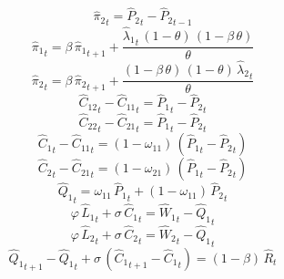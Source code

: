 \begin{dmath}
{{\hat{\pi}_{2}}}_{t}={{\hat{P}_{2}}}_{t}-{{\hat{P}_{2}}}_{t-1}
\end{dmath}
\begin{dmath}
{{\hat{\pi}_{1}}}_{t}={{\beta}}\, {{\hat{\pi}_{1}}}_{t+1}+\frac{{{\hat{\lambda}_{1}}}_{t}\, \left(1-{{\theta}}\right)\, \left(1-{{\beta}}\, {{\theta}}\right)}{{{\theta}}}
\end{dmath}
\begin{dmath}
{{\hat{\pi}_{2}}}_{t}={{\beta}}\, {{\hat{\pi}_{2}}}_{t+1}+\frac{\left(1-{{\beta}}\, {{\theta}}\right)\, \left(1-{{\theta}}\right)\, {{\hat{\lambda}_{2}}}_{t}}{{{\theta}}}
\end{dmath}
\begin{dmath}
{{\hat{C}_{1 2}}}_{t}-{{\hat{C}_{1 1}}}_{t}={{\hat{P}_{1}}}_{t}-{{\hat{P}_{2}}}_{t}
\end{dmath}
\begin{dmath}
{{\hat{C}_{2 2}}}_{t}-{{\hat{C}_{2 1}}}_{t}={{\hat{P}_{1}}}_{t}-{{\hat{P}_{2}}}_{t}
\end{dmath}
\begin{dmath}
{{\hat{C}_{1}}}_{t}-{{\hat{C}_{1 1}}}_{t}=\left(1-{{\omega_{11}}}\right)\, \left({{\hat{P}_{1}}}_{t}-{{\hat{P}_{2}}}_{t}\right)
\end{dmath}
\begin{dmath}
{{\hat{C}_{2}}}_{t}-{{\hat{C}_{2 1}}}_{t}=\left(1-{{\omega_{21}}}\right)\, \left({{\hat{P}_{1}}}_{t}-{{\hat{P}_{2}}}_{t}\right)
\end{dmath}
\begin{dmath}
{{\hat{Q}_{1}}}_{t}={{\omega_{11}}}\, {{\hat{P}_{1}}}_{t}+\left(1-{{\omega_{11}}}\right)\, {{\hat{P}_{2}}}_{t}
\end{dmath}
\begin{dmath}
{{\varphi}}\, {{\hat{L}_{1}}}_{t}+{{\sigma}}\, {{\hat{C}_{1}}}_{t}={{\hat{W}_{1}}}_{t}-{{\hat{Q}_{1}}}_{t}
\end{dmath}
\begin{dmath}
{{\varphi}}\, {{\hat{L}_{2}}}_{t}+{{\sigma}}\, {{\hat{C}_{2}}}_{t}={{\hat{W}_{2}}}_{t}-{{\hat{Q}_{1}}}_{t}
\end{dmath}
\begin{dmath}
{{\hat{Q}_{1}}}_{t+1}-{{\hat{Q}_{1}}}_{t}+{{\sigma}}\, \left({{\hat{C}_{1}}}_{t+1}-{{\hat{C}_{1}}}_{t}\right)=\left(1-{{\beta}}\right)\, {{\hat{R}}}_{t}
\end{dmath}
